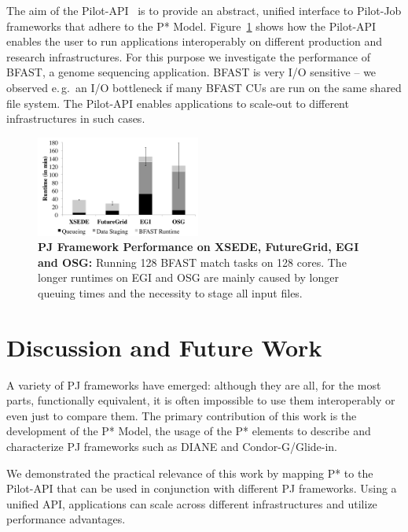 \documentclass{sig-alternate}
\begin{document}
The aim of the Pilot-API~\cite{pilot_api} is to provide an abstract, unified
interface to Pilot-Job frameworks that adhere to the P* Model.
Figure~\ref{fig:perf_perf-bfast-bj} shows how the Pilot-API enables the user
to run applications interoperably on different production and research
infrastructures. For this purpose we investigate the performance of BFAST, a
genome sequencing application. BFAST is very I/O sensitive -- we observed
e.\,g.\ an I/O bottleneck if many BFAST CUs are run on the same shared file
system. The Pilot-API enables applications to scale-out to different
infrastructures in such cases.

 
\begin{figure}[t]
	\upp
\centering
\includegraphics[width=0.48\textwidth]{perf/interop/128-bfast-egi-fg-xsede-osg.pdf}
\caption{\textbf{PJ Framework Performance on XSEDE, FutureGrid, EGI and 
  OSG:} Running 128 BFAST match tasks on 128 cores. The longer runtimes on EGI 
  and OSG are mainly caused by  longer queuing times and the necessity to   stage all input files. }\upp\upp\upp
  \label{fig:perf_perf-bfast-bj}
\end{figure}


\section{Discussion and Future Work} 
\label{sec:discussion-future-work}

A variety of PJ frameworks have emerged: although they are all, for the most
parts, functionally equivalent, it is often impossible to use them
interoperably or even just to compare them. The primary contribution of this
work is the development of the P* Model, the usage of the P* elements to
describe and characterize PJ frameworks such as DIANE and Condor-G/Glide-in.

We demonstrated the practical relevance of this work by mapping P* to the
Pilot-API that can be used in conjunction with different PJ frameworks. Using
a unified API, applications can scale across different infrastructures and
utilize performance advantages.
\end{document}

